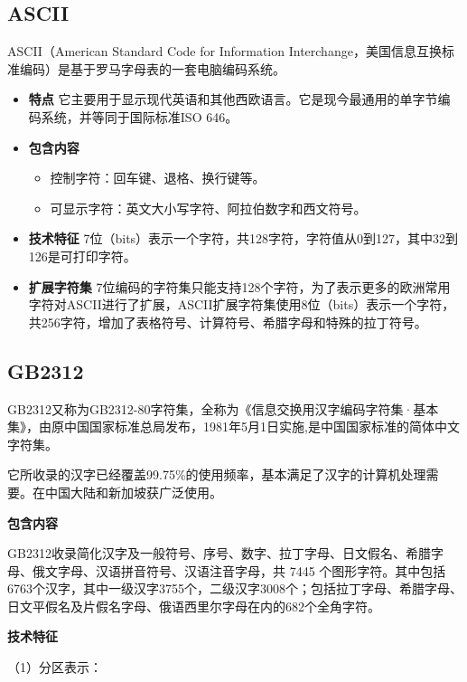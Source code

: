 \documentclass[doctor,openright,twoside]{sjtuthesis}
\providecommand{\tightlist}{%
    \setlength{\itemsep}{0pt}\setlength{\parskip}{0pt}}
\theoremstyle{plain}
\theoremstyle{definition}
\theoremstyle{remark}
\theoremstyle{ocrenumbox}
\theoremstyle{plain}
\begin{document}
\hypertarget{ascii}{%
\subsection{ASCII}\label{ascii}}

ASCII（American Standard Code for Information
Interchange，美国信息互换标准编码）是基于罗马字母表的一套电脑编码系统。

\begin{itemize}
\tightlist
\item
  \textbf{特点}
  它主要用于显示现代英语和其他西欧语言。它是现今最通用的单字节编码系统，并等同于国际标准ISO
  646。
\item
  \textbf{包含内容}

  \begin{itemize}
  \tightlist
  \item
    控制字符：回车键、退格、换行键等。
  \item
    可显示字符：英文大小写字符、阿拉伯数字和西文符号。
  \end{itemize}
\item
  \textbf{技术特征}
  7位（bits）表示一个字符，共128字符，字符值从0到127，其中32到126是可打印字符。
\item
  \textbf{扩展字符集}
  7位编码的字符集只能支持128个字符，为了表示更多的欧洲常用字符对ASCII进行了扩展，ASCII扩展字符集使用8位（bits）表示一个字符，共256字符，增加了表格符号、计算符号、希腊字母和特殊的拉丁符号。
\end{itemize}

\hypertarget{gb2312}{%
\subsection{GB2312}\label{gb2312}}

GB2312又称为GB2312-80字符集，全称为《信息交换用汉字编码字符集·基本集》，由原中国国家标准总局发布，1981年5月1日实施,是中国国家标准的简体中文字符集。

它所收录的汉字已经覆盖99.75\%的使用频率，基本满足了汉字的计算机处理需要。在中国大陆和新加坡获广泛使用。

\textbf{包含内容}

GB2312收录简化汉字及一般符号、序号、数字、拉丁字母、日文假名、希腊字母、俄文字母、汉语拼音符号、汉语注音字母，共
7445
个图形字符。其中包括6763个汉字，其中一级汉字3755个，二级汉字3008个；包括拉丁字母、希腊字母、日文平假名及片假名字母、俄语西里尔字母在内的682个全角字符。

\textbf{技术特征}

（1）分区表示：
\end{document}
